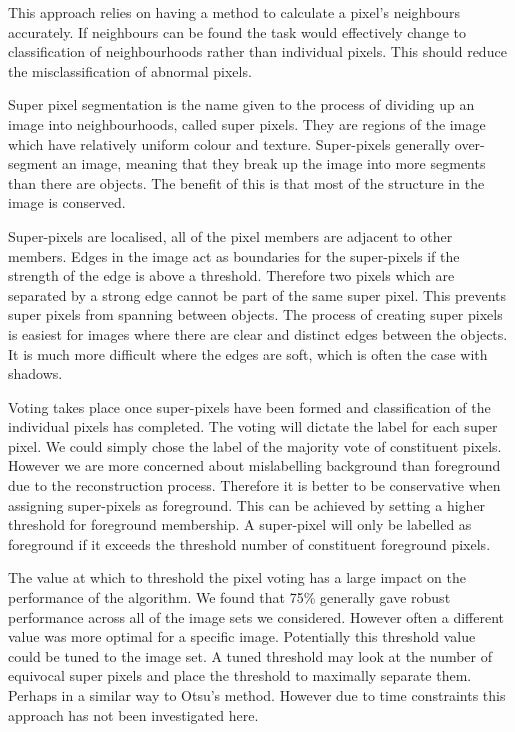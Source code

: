 \documentclass[12pt]{IIBproject}
\begin{document}
This approach relies on having a method to calculate a pixel's neighbours accurately. If neighbours can be found the task would effectively change to classification of neighbourhoods rather than individual pixels. This should reduce the misclassification of abnormal pixels.

Super pixel segmentation is the name given to the process of dividing up an image into neighbourhoods, called super pixels. They are regions of the image which have relatively uniform colour and texture. Super-pixels generally over-segment an image, meaning that they break up the image into more segments than there are objects. The benefit of this is that most of the structure in the image is conserved\cite{RenMalik03}.  

Super-pixels are localised, all of the pixel members are adjacent to other members. Edges in the image act as boundaries for the super-pixels if the strength of the edge is above a threshold. Therefore two pixels which are separated by a strong edge cannot be part of the same super pixel. This prevents super pixels from spanning between objects. The process of creating super pixels is easiest for images where there are clear and distinct edges between the objects. It is much more difficult where the edges are soft, which is often the case with shadows. 

Voting takes place once super-pixels have been formed and classification of the individual pixels has completed. The voting will dictate the label for each super pixel. We could simply chose the label of the majority vote of constituent pixels. However we are more concerned about mislabelling background than foreground due to the reconstruction process. Therefore it is better to be conservative when assigning super-pixels as foreground. This can be achieved by setting a higher threshold for foreground membership. A super-pixel will only be labelled as foreground if it exceeds the threshold number of constituent foreground pixels.

The value at which to threshold the pixel voting has a large impact on the performance of the algorithm. We found that 75\% generally gave robust performance across all of the image sets we considered. However often a different value was more optimal for a specific image. Potentially this threshold value could be tuned to the image set. A tuned threshold may look at the number of equivocal super pixels and place the threshold to maximally separate them. Perhaps in a similar way to Otsu's method. However due to time constraints this approach has not been investigated here. 
\end{document}
